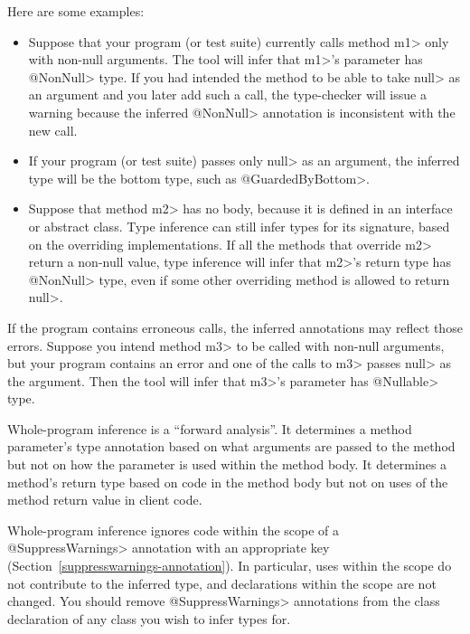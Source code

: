 Here are some examples:

\begin{itemize}
\item
Suppose that your program (or test suite) currently calls
method \<m1> only with non-null
arguments.  The tool will infer that \<m1>'s parameter has
\<@NonNull> type.  If you had intended the method to be able to
take \<null> as an argument and you later add such a call, the type-checker
will issue a warning because the inferred \<@NonNull>
annotation is inconsistent with the new call.

\item
If your program (or test suite) passes only \<null> as an argument, the
inferred type will be the bottom type, such as \<@GuardedByBottom>.

\item
Suppose that method \<m2> has no body, because it is defined in an interface or
abstract class.
Type inference can still infer types for its signature, based on the
overriding implementations.
If all the methods that override \<m2> return a non-null value, type
inference will infer that \<m2>'s return type has \<@NonNull> type, even if
some other overriding method is allowed to return
\<null>.

\end{itemize}

If the program contains erroneous calls, the
inferred annotations may reflect those errors.
Suppose you intend method \<m3> to be called with
non-null arguments, but your program contains an error and one of the calls
to \<m3> passes \<null> as the argument.  Then the tool will infer that
\<m3>'s parameter has \<@Nullable> type.


Whole-program inference is a ``forward analysis''.
It determines a method parameter's type
annotation based on what arguments are passed to the method but not on how the
parameter is used within the method body.
It determines a method's return type based on code in the method body but
not on uses of the method return value in client code.



Whole-program inference ignores code within the scope of a
\<@SuppressWarnings> annotation with an appropriate key
(Section~\ref{suppresswarnings-annotation}).  In particular, uses within
the scope do not contribute to the inferred type, and declarations within
the scope are not changed.  You should remove \<@SuppressWarnings> annotations
from the class declaration of any class you wish to infer types for.

